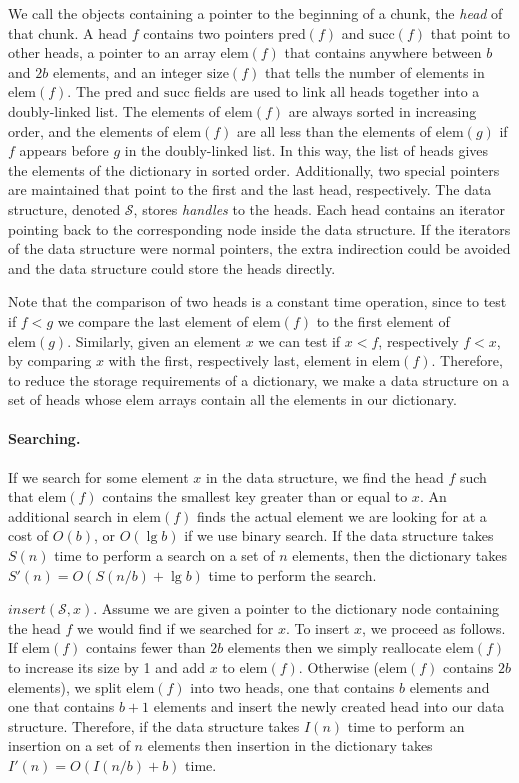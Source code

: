 \documentclass{DIKU-article}
\newcommand{\Insert}{\mbox{$\mathit{insert}$}}
\newcommand{\Pred}{\mathrm{pred}}
\newcommand{\Succ}{\mathrm{succ}}
\newcommand{\Elem}{\mathrm{elem}}
\newcommand{\Size}{\mathrm{size}}
\begin{document}
We call the objects containing a pointer to the beginning of a chunk,
the \emph{head} of that chunk.  A head $f$ contains two pointers
$\Pred(f)$ and $\Succ(f)$ that point to other heads, a pointer to an
array $\Elem(f)$ that contains anywhere between $b$ and $2b$ elements,
and an integer $\Size(f)$ that tells the number of elements in
$\Elem(f)$.  The $\Pred$ and $\Succ$ fields are used to link all heads
together into a doubly-linked list.  The elements of $\Elem(f)$ are
always sorted in increasing order, and the elements of $\Elem(f)$ are
all less than the elements of $\Elem(g)$ if $f$ appears before $g$ in
the doubly-linked list.  In this way, the list of heads gives the
elements of the dictionary in sorted order.  Additionally, two special
pointers are maintained that point to the first and the last head,
respectively.  The data structure, denoted $\mathcal{S}$, stores
\emph{handles} to the heads.  Each head contains an iterator pointing
back to the corresponding node inside the data structure.  If the
iterators of the data structure were normal pointers, the extra
indirection could be avoided and the data structure could store the
heads directly.

Note that the comparison of two heads is a constant time operation,
since to test if $f<g$ we compare the last element of $\Elem(f)$ to
the first element of $\Elem(g)$.  Similarly, given an element $x$ we
can test if $x<f$, respectively $f<x$, by comparing $x$ with the
first, respectively last, element in $\Elem(f)$.  Therefore, to reduce
the storage requirements of a dictionary, we make a data structure on
a set of heads whose $\Elem$ arrays contain all the elements in our
dictionary.

\paragraph{Searching.}
If we search for some element $x$ in the data structure, we find the
head $f$ such that $\Elem(f)$ contains the smallest key greater
than or equal to $x$.  An additional search in $\Elem(f)$ finds the
actual element we are looking for at a cost of $O(b)$, or $O(\lg b)$
if we use binary search.  If the data structure takes $S(n)$ time to
perform a search on a set of $n$ elements, then the dictionary takes
$S'(n)=O(S(n/b)+\lg b)$ time to perform the search.

\Insert{}$(\mathcal{S}, x)$.
Assume we are given a pointer to the dictionary node containing the
head $f$ we would find if we searched for $x$.  To insert $x$, we
proceed as follows.  If $\Elem(f)$ contains fewer than $2b$ elements
then we simply reallocate $\Elem(f)$ to increase its size by 1 and add
$x$ to $\Elem(f)$.  Otherwise ($\Elem(f)$ contains $2b$ elements), we split
$\Elem(f)$ into two heads, one that contains $b$ elements and one
that contains $b+1$ elements and insert the newly created head
into our data structure.  Therefore, if the data structure takes
$I(n)$ time to perform an insertion on a set of $n$ elements then
insertion in the dictionary takes $I'(n)=O(I(n/b)+b)$ time.
\end{document}
